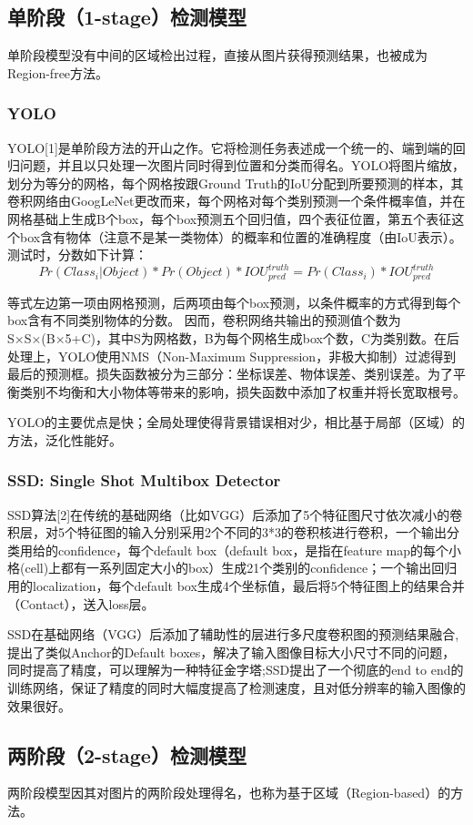 \documentclass[journal,transmag]{IEEEtran}
\begin{document}
\subsection{单阶段（1-stage）检测模型}
单阶段模型没有中间的区域检出过程，直接从图片获得预测结果，也被成为Region-free方法。
\subsubsection{YOLO}
YOLO[1]是单阶段方法的开山之作。它将检测任务表述成一个统一的、端到端的回归问题，并且以只处理一次图片同时得到位置和分类而得名。YOLO将图片缩放，划分为等分的网格，每个网格按跟Ground Truth的IoU分配到所要预测的样本，其卷积网络由GoogLeNet更改而来，每个网格对每个类别预测一个条件概率值，并在网格基础上生成B个box，每个box预测五个回归值，四个表征位置，第五个表征这个box含有物体（注意不是某一类物体）的概率和位置的准确程度（由IoU表示）。测试时，分数如下计算：
$$Pr(Class_{i}|Object)*Pr(Object)*IOU_{pred}^{truth}=Pr(Class_{i})*IOU_{pred}^{truth}$$

等式左边第一项由网格预测，后两项由每个box预测，以条件概率的方式得到每个box含有不同类别物体的分数。 因而，卷积网络共输出的预测值个数为S×S×(B×5+C)，其中S为网格数，B为每个网格生成box个数，C为类别数。在后处理上，YOLO使用NMS（Non-Maximum Suppression，非极大抑制）过滤得到最后的预测框。损失函数被分为三部分：坐标误差、物体误差、类别误差。为了平衡类别不均衡和大小物体等带来的影响，损失函数中添加了权重并将长宽取根号。

YOLO的主要优点是快；全局处理使得背景错误相对少，相比基于局部（区域）的方法，泛化性能好。
\subsubsection{SSD: Single Shot Multibox Detector}
SSD算法[2]在传统的基础网络（比如VGG）后添加了5个特征图尺寸依次减小的卷积层，对5个特征图的输入分别采用2个不同的3*3的卷积核进行卷积，一个输出分类用给的confidence，每个default box（default box，是指在feature map的每个小格(cell)上都有一系列固定大小的box）生成21个类别的confidence；一个输出回归用的localization，每个default box生成4个坐标值，最后将5个特征图上的结果合并（Contact），送入loss层。

SSD在基础网络（VGG）后添加了辅助性的层进行多尺度卷积图的预测结果融合,提出了类似Anchor的Default boxes，解决了输入图像目标大小尺寸不同的问题，同时提高了精度，可以理解为一种特征金字塔;SSD提出了一个彻底的end to end的训练网络，保证了精度的同时大幅度提高了检测速度，且对低分辨率的输入图像的效果很好。
\subsection{两阶段（2-stage）检测模型}
两阶段模型因其对图片的两阶段处理得名，也称为基于区域（Region-based）的方法。
\end{document}
